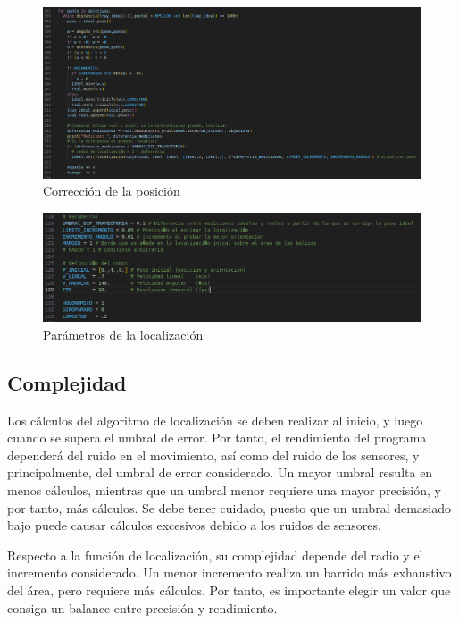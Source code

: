 \begin{figure}[htb]
  \centering
  \includegraphics[width=1\linewidth]{images/localizacion6.png}
  \caption{Corrección de la posición}
  \label{fig:localizacion_correccion}
\end{figure}
\begin{figure}[htb]
  \centering
  \includegraphics[width=1\linewidth]{images/localizacion3.png}
  \caption{Parámetros de la localización}
  \label{fig:localizacion_param}
\end{figure}

\subsection{Complejidad}
Los cálculos del algoritmo de localización se deben realizar al inicio, y luego cuando se supera el umbral de error. Por tanto, el rendimiento del programa dependerá del ruido en el movimiento, así como del ruido de los sensores, 
y principalmente, del umbral de error considerado. Un mayor umbral resulta en menos cálculos, mientras que un umbral menor requiere una mayor precisión, y por tanto, más cálculos. Se debe tener cuidado, puesto que un umbral demasiado bajo 
puede causar cálculos excesivos debido a los ruidos de sensores.

\bigskip Respecto a la función de localización, su complejidad depende del radio y el incremento considerado. Un menor incremento realiza un barrido más exhaustivo del área, pero requiere más cálculos. Por tanto, es importante elegir un valor que 
consiga un balance entre precisión y rendimiento.

